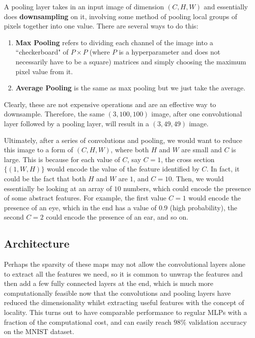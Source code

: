   \begin{definition}
    A pooling layer takes in an input image of dimension $(C, H, W)$ and essentially does \textbf{downsampling} on it, involving some method of pooling local groups of pixels together into one value. There are several ways to do this: 
    \begin{enumerate}
      \item \textbf{Max Pooling} refers to dividing each channel of the image into a ``checkerboard" of $P \times P$ (where $P$ is a hyperparameter and does not necessarily have to be a square) matrices and simply choosing the maximum pixel value from it. 
      \item \textbf{Average Pooling} is the same as max pooling but we just take the average. 
    \end{enumerate}
    Clearly, these are not expensive operations and are an effective way to downsample. Therefore, the same $(3, 100, 100)$ image, after one convolutional layer followed by a pooling layer, will result in a $(3, 49, 49)$ image.  
  \end{definition}

  Ultimately, after a series of convolutions and pooling, we would want to reduce this image to a form of $(C, H, W)$, where both $H$ and $W$ are small and $C$ is large. This is because for each value of $C$, say $C = 1$, the cross section $\{(1, W, H)\}$ would encode the value of the feature identified by $C$. In fact, it could be the fact that both $H$ and $W$ are $1$, and $C = 10$. Then, we would essentially be looking at an array of $10$ numbers, which could encode the presence of some abstract features. For example, the first value $C = 1$ would encode the presence of an eye, which in the end has a value of $0.9$ (high probability), the second $C = 2$ could encode the presence of an ear, and so on. 

\subsection{Architecture} 

  Perhaps the sparsity of these maps may not allow the convolutional layers alone to extract all the features we need, so it is common to unwrap the features and then add a few fully connected layers at the end, which is much more computationally feasible now that the convolutions and pooling layers have reduced the dimensionality whilst extracting useful features with the concept of locality. This turns out to have comparable performance to regular MLPs with a fraction of the computational cost, and can easily reach $98\%$ validation accuracy on the MNIST dataset. 

